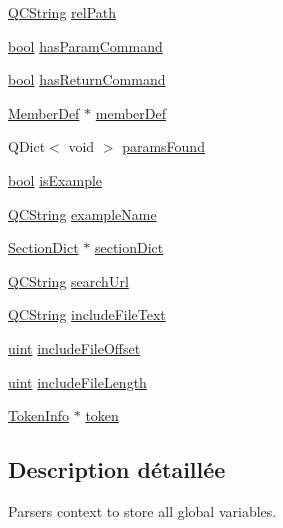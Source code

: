 \begin{DoxyCompactItemize}
\item 
\hyperlink{class_q_c_string}{Q\+C\+String} \hyperlink{struct_doc_parser_context_a603ea82abcc694bf2aeb91d85378aa0d}{rel\+Path}
\item 
\hyperlink{qglobal_8h_a1062901a7428fdd9c7f180f5e01ea056}{bool} \hyperlink{struct_doc_parser_context_adfc69df470290ef49cf32d0e6cd83556}{has\+Param\+Command}
\item 
\hyperlink{qglobal_8h_a1062901a7428fdd9c7f180f5e01ea056}{bool} \hyperlink{struct_doc_parser_context_ae20ce1c3e50ef1b4399b50f29f61607f}{has\+Return\+Command}
\item 
\hyperlink{class_member_def}{Member\+Def} $\ast$ \hyperlink{struct_doc_parser_context_ae598a4b4f7337ef13ffaff9df878a8df}{member\+Def}
\item 
Q\+Dict$<$ void $>$ \hyperlink{struct_doc_parser_context_a304223304af1183a5afa3b9a36a921af}{params\+Found}
\item 
\hyperlink{qglobal_8h_a1062901a7428fdd9c7f180f5e01ea056}{bool} \hyperlink{struct_doc_parser_context_aa499773e2ac0458b4f616b07386e5685}{is\+Example}
\item 
\hyperlink{class_q_c_string}{Q\+C\+String} \hyperlink{struct_doc_parser_context_a688f0551d40b6f51fb0daaa76631502b}{example\+Name}
\item 
\hyperlink{class_section_dict}{Section\+Dict} $\ast$ \hyperlink{struct_doc_parser_context_a0e457c01f7cfa2b60d7af671cbf6fc9c}{section\+Dict}
\item 
\hyperlink{class_q_c_string}{Q\+C\+String} \hyperlink{struct_doc_parser_context_aa2bfd37ddbdec7e8751e6585cc53beb8}{search\+Url}
\item 
\hyperlink{class_q_c_string}{Q\+C\+String} \hyperlink{struct_doc_parser_context_a741637628985f24ccf69b051638804ca}{include\+File\+Text}
\item 
\hyperlink{qglobal_8h_a4d3943ddea65db7163a58e6c7e8df95a}{uint} \hyperlink{struct_doc_parser_context_a8dca590b7e1548f62368aca98a1f8e5f}{include\+File\+Offset}
\item 
\hyperlink{qglobal_8h_a4d3943ddea65db7163a58e6c7e8df95a}{uint} \hyperlink{struct_doc_parser_context_ada8cb01b66567027d0799c5ce1e5dc2f}{include\+File\+Length}
\item 
\hyperlink{struct_token_info}{Token\+Info} $\ast$ \hyperlink{struct_doc_parser_context_a8da54182d40bdc81e85cd29db88230b6}{token}
\end{DoxyCompactItemize}


\subsection{Description détaillée}
Parser\textquotesingle{}s context to store all global variables. 

